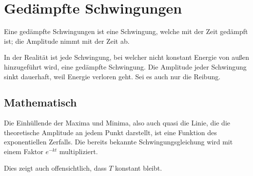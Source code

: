 \documentclass{article}
\begin{document}
\section{Gedämpfte Schwingungen}
Eine gedämpfte Schwingungen ist eine Schwingung, welche mit der Zeit gedämpft ist; die Amplitude nimmt mit der Zeit ab.
 
In der Realität ist jede Schwingung, bei welcher nicht konstant Energie von außen hinzugeführt wird, eine gedämpfte Schwingung. Die Amplitude jeder Schwingung sinkt dauerhaft, weil Energie verloren geht. Sei es auch nur die Reibung.
\begin{center}
\end{center} 
\subsection{Mathematisch}  
Die Einhüllende der Maxima und Minima, also auch quasi die Linie, die die theoretische Amplitude an jedem Punkt darstellt, ist eine Funktion des exponentiellen Zerfalls. Die bereits bekannte Schwingungsgleichung wird mit einem Faktor $e^{-kt}$ multipliziert.
 
Dies zeigt auch offensichtlich, dass $T$ konstant bleibt. 
\end{document}
